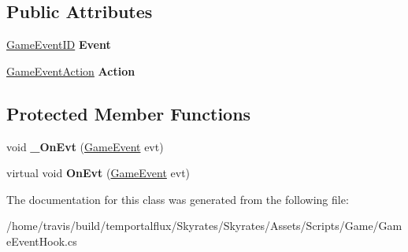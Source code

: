 \subsection*{Public Attributes}
\begin{DoxyCompactItemize}
\item 
\hypertarget{class_skyrates_1_1_game_1_1_event_1_1_game_event_hook_acd8dc46b1cddfa31d79bd17acbed5964}{\hyperlink{namespace_skyrates_1_1_game_1_1_event_ad31565d2f03f234f8f77ebf23ff8f150}{Game\-Event\-I\-D} {\bfseries Event}}\label{class_skyrates_1_1_game_1_1_event_1_1_game_event_hook_acd8dc46b1cddfa31d79bd17acbed5964}

\item 
\hypertarget{class_skyrates_1_1_game_1_1_event_1_1_game_event_hook_a4716420ecda598ac571d69fc40d0748d}{\hyperlink{class_skyrates_1_1_game_1_1_event_1_1_game_event_hook_1_1_game_event_action}{Game\-Event\-Action} {\bfseries Action}}\label{class_skyrates_1_1_game_1_1_event_1_1_game_event_hook_a4716420ecda598ac571d69fc40d0748d}

\end{DoxyCompactItemize}
\subsection*{Protected Member Functions}
\begin{DoxyCompactItemize}
\item 
\hypertarget{class_skyrates_1_1_game_1_1_event_1_1_game_event_hook_a1bf467960785c98b1ff269c673b22a4b}{void {\bfseries \-\_\-\-On\-Evt} (\hyperlink{class_skyrates_1_1_game_1_1_event_1_1_game_event}{Game\-Event} evt)}\label{class_skyrates_1_1_game_1_1_event_1_1_game_event_hook_a1bf467960785c98b1ff269c673b22a4b}

\item 
\hypertarget{class_skyrates_1_1_game_1_1_event_1_1_game_event_hook_abaae237eb45955798d090fcc000fb0fe}{virtual void {\bfseries On\-Evt} (\hyperlink{class_skyrates_1_1_game_1_1_event_1_1_game_event}{Game\-Event} evt)}\label{class_skyrates_1_1_game_1_1_event_1_1_game_event_hook_abaae237eb45955798d090fcc000fb0fe}

\end{DoxyCompactItemize}


The documentation for this class was generated from the following file\-:\begin{DoxyCompactItemize}
\item 
/home/travis/build/temportalflux/\-Skyrates/\-Skyrates/\-Assets/\-Scripts/\-Game/Game\-Event\-Hook.\-cs\end{DoxyCompactItemize}
